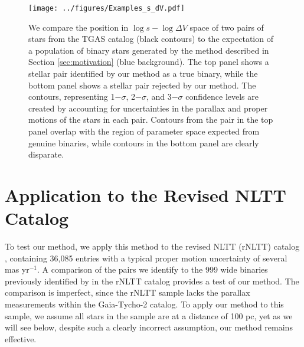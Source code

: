 \documentclass[usenatbib]{mnras}
\begin{document}
\begin{figure*}
\begin{center}
\texttt{[image: ../figures/Examples\_s\_dV.pdf]}
\caption{We compare the position in $\log s-\log \Delta V$ space of two pairs of stars from the TGAS catalog (black contours) to the expectation of a population of binary stars generated by the method described in Section \ref{sec:motivation} (blue background). The top panel shows a stellar pair identified by our method as a true binary, while the bottom panel shows a stellar pair rejected by our method. The contours, representing 1$-\sigma$, 2$-\sigma$, and 3$-\sigma$ confidence levels are created by accounting for uncertainties in the parallax and proper motions of the stars in each pair. Contours from the pair in the top panel overlap with the region of parameter space expected from genuine binaries, while contours in the bottom panel are clearly disparate. }
\label{fig:example_s_dV}
\end{center}
\end{figure*}





\section{Application to the Revised NLTT Catalog} \label{sec:rNLTT}


To test our method, we apply this method to the revised NLTT (rNLTT) catalog \citep{gould03, salim03}, containing 36,085 entries with a typical proper motion uncertainty of several mas yr$^{-1}$. A comparison of the pairs we identify to the 999 wide binaries previously identified by \citet[][hereafter CG04]{chaname04} in the rNLTT catalog provides a test of our method. The comparison is imperfect, since the rNLTT sample lacks the parallax measurements within the Gaia-Tycho-2 catalog. To apply our method to this sample, we assume all stars in the sample are at a distance of 100 pc, yet as we will see below, despite such a clearly incorrect assumption, our method remains effective.
\end{document}
